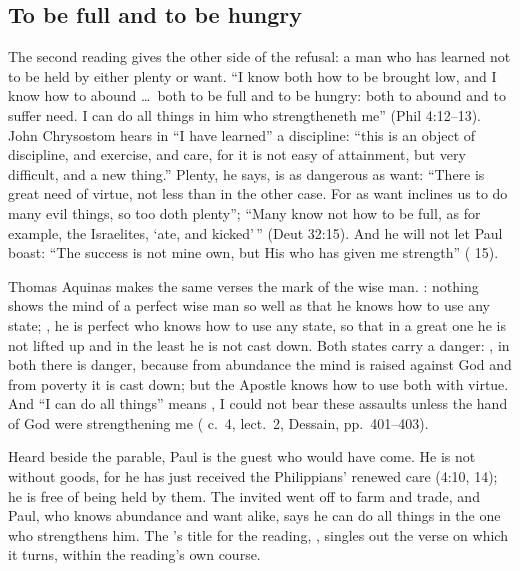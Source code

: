 \subsection{To be full and to be hungry}

The second reading gives the other side of the refusal: a man who has learned
not to be held by either plenty or want. ``I know both how to be brought low,
and I know how to abound \ldots\ both to be full and to be hungry: both to
abound and to suffer need. I can do all things in him who strengtheneth me''
(Phil 4:12--13). John Chrysostom hears in ``I have learned'' a discipline:
``this is an object of discipline, and exercise, and care, for it is not easy of
attainment, but very difficult, and a new thing.'' Plenty, he says, is as
dangerous as want: ``There is great need of virtue, not less than in the other
case. For as want inclines us to do many evil things, so too doth plenty'';
``Many know not how to be full, as for example, the Israelites, `ate, and
kicked'\,'' (Deut 32:15). And he will not let Paul boast: ``The success is not
mine own, but His who has given me strength'' (
15).

Thomas Aquinas makes the same verses the mark of the wise man.
: nothing shows the mind of a perfect wise man so well as that he
knows how to use any state; , he is
perfect who knows how to use any state, so that in a great one he is not lifted
up and in the least he is not cast down. Both states carry a danger: ,
in both there is danger, because from abundance the mind is raised against God
and from poverty it is cast down; but the Apostle knows how to use both with
virtue. And ``I can do all things'' means , I could not bear these assaults unless
the hand of God were strengthening me ( c.~4, lect.~2,
Dessain, pp.~401--403).

Heard beside the parable, Paul is the guest who would have come. He is not
without goods, for he has just received the Philippians' renewed care (4:10,
14); he is free of being held by them. The invited went off to farm and trade, and Paul, who knows
abundance and want alike, says he can do all things in the one who strengthens
him. The 's title for the reading,
, singles out the verse on which it
turns, within the reading's own course.

